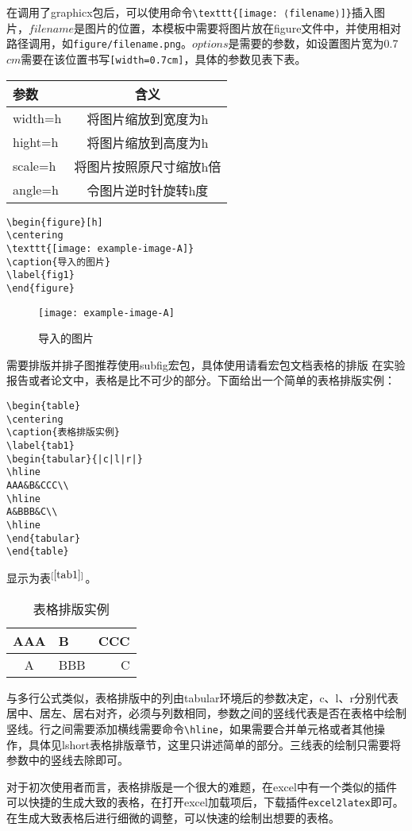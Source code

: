 在调用了graphicx包后，可以使用命令\verb|\texttt{[image: ⟨filename⟩]}|插入图片，$filename$是图片的位置，本模板中需要将图片放在figure文件中，并使用相对路径调用，如\verb|figure/filename.png|。$options$是需要的参数，如设置图片宽为0.7$cm$需要在该位置书写\verb|[width=0.7cm]|，具体的参数见表下表。
\begin{table}[h]
\centering
\begin{tabular}{lc}
\hline
参数&含义\\
\hline
width=h&将图片缩放到宽度为h\\
hight=h&将图片缩放到高度为h\\
scale=h&将图片按照原尺寸缩放h倍\\
angle=h&令图片逆时针旋转h度\\
\hline
\end{tabular}
\label{table1}
\end{table}

\begin{verbatim}
\begin{figure}[h]
\centering
\texttt{[image: example-image-A]}
\caption{导入的图片}
\label{fig1}
\end{figure}
\end{verbatim}
\begin{figure}[h]
\centering
\texttt{[image: example-image-A]}
\caption{导入的图片}
\label{fig1}
\end{figure}
需要排版并排子图推荐使用subfig宏包，具体使用请看宏包文档{表格的排版}
在实验报告或者论文中，表格是比不可少的部分。下面给出一个简单的表格排版实例：
\begin{verbatim}
\begin{table}
\centering
\caption{表格排版实例}
\label{tab1}
\begin{tabular}{|c|l|r|}
\hline
AAA&B&CCC\\
\hline
A&BBB&C\\
\hline
\end{tabular}
\end{table}
\end{verbatim}

显示为表$^{[\ref{tab1}]}$。
\begin{table}[h]
\centering
\caption{表格排版实例}
\label{tab1}
\begin{tabular}{|c|l|r|}
\hline
AAA&B&CCC\\
\hline
A&BBB&C\\
\hline
\end{tabular}
\end{table}
与多行公式类似，表格排版中的列由tabular环境后的参数决定，c、l、r分别代表居中、居左、居右对齐，必须与列数相同，参数之间的竖线代表是否在表格中绘制竖线。行之间需要添加横线需要命令\verb|\hline|，如果需要合并单元格或者其他操作，具体见lshort表格排版章节，这里只讲述简单的部分。三线表的绘制只需要将参数中的竖线去除即可。

对于初次使用者而言，表格排版是一个很大的难题，在excel中有一个类似的插件可以快捷的生成大致的表格，在打开excel加载项后，下载插件\verb|excel2latex|即可。在生成大致表格后进行细微的调整，可以快速的绘制出想要的表格。